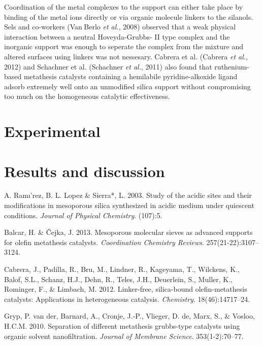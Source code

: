 \documentclass[]{article}
\begin{document}
Coordination of the metal complexes to the support can either take place
by binding of the metal ions directly or via organic molecule linkers to
the silanols. Sels and co-workers (Van Berlo \emph{et al.}, 2008)
observed that a weak physical interaction between a neutral
Hoveyda-Grubbs- II type complex and the inorganic support was enough to
seperate the complex from the mixture and altered surfaces using linkers
was not nessesary. Cabrera et al. (Cabrera \emph{et al.}, 2012) and
Schachner et al. (Schachner \emph{et al.}, 2011) also found that
ruthenium-based metathesis catalysts containing a hemilabile
pyridine-alkoxide ligand adsorb extremely well onto an unmodified silica
support without compromising too much on the homogeneous catalytic
effectiveness.

\hypertarget{experimental}{%
\section{Experimental}\label{experimental}}

\hypertarget{results-and-discussion}{%
\section{Results and discussion}\label{results-and-discussion}}

\listoffigures

\hypertarget{refs}{}
\leavevmode\hypertarget{ref-RN75}{}%
A. Ramı'rez, B. L. Lopez \& Sierra*, L. 2003. Study of the acidic sites
and their modifications in mesoporous silica synthesized in acidic
medium under quiescent conditions. \emph{Journal of Physical Chemistry}.
(107):5.

\leavevmode\hypertarget{ref-RN44}{}%
Balcar, H. \& Čejka, J. 2013. Mesoporous molecular sieves as advanced
supports for olefin metathesis catalysts. \emph{Coordination Chemistry
Reviews}. 257(21-22):3107--3124.

\leavevmode\hypertarget{ref-RN84}{}%
Cabrera, J., Padilla, R., Bru, M., Lindner, R., Kageyama, T., Wilckens,
K., Balof, S.L., Schanz, H.J., Dehn, R., Teles, J.H., Deuerlein, S.,
Muller, K., Rominger, F., \& Limbach, M. 2012. Linker-free, silica-bound
olefin-metathesis catalysts: Applications in heterogeneous catalysis.
\emph{Chemistry}. 18(46):14717--24.

\leavevmode\hypertarget{ref-RN73}{}%
Gryp, P. van der, Barnard, A., Cronje, J.-P., Vlieger, D. de, Marx, S.,
\& Vosloo, H.C.M. 2010. Separation of different metathesis grubbs-type
catalysts using organic solvent nanofiltration. \emph{Journal of
Membrane Science}. 353(1-2):70--77.
\end{document}
